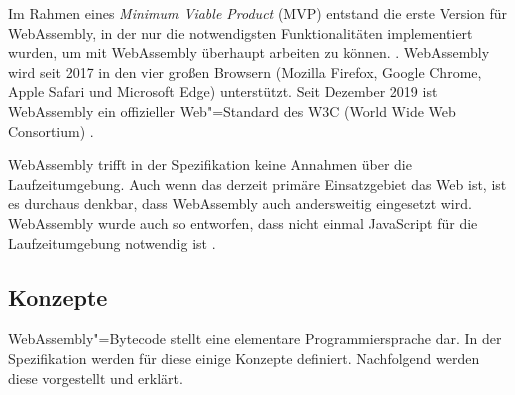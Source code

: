 Im Rahmen eines \emph{Minimum Viable Product} (MVP) entstand die erste Version für WebAssembly, in der nur die notwendigsten Funktionalitäten implementiert wurden, um mit WebAssembly überhaupt arbeiten zu können. \cite{WebAssemblyWebsite}. WebAssembly wird seit 2017 in den vier großen Browsern (Mozilla Firefox, Google Chrome, Apple Safari und Microsoft Edge) unterstützt. Seit Dezember 2019 ist WebAssembly ein offizieller Web"=Standard des W3C (World Wide Web Consortium) \cite{WebAssemblyW3CPressStandard}.

WebAssembly trifft in der Spezifikation keine Annahmen über die Laufzeitumgebung. Auch wenn das derzeit primäre Einsatzgebiet das Web ist, ist es durchaus denkbar, dass WebAssembly auch andersweitig eingesetzt wird. WebAssembly wurde auch so entworfen, dass nicht einmal JavaScript für die Laufzeitumgebung notwendig ist \cite{WebAssemblyWebsite}.

\subsection{Konzepte}
\label{subsec:WebAssembly-Konzepte}
WebAssembly"=Bytecode stellt eine elementare Programmiersprache dar. In der Spezifikation werden für diese einige Konzepte \cite{WebAssemblySpecification} definiert. Nachfolgend werden diese vorgestellt und erklärt.

